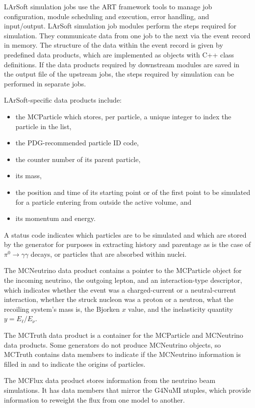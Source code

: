 \documentclass[12pt]{elsarticle}
\begin{document}
LArSoft simulation jobs use the ART framework tools to manage job configuration, module scheduling and execution, error handling, and input/output. LArSoft simulation job modules perform the steps required for simulation. They communicate data from one job to the next via the event record in memory. The structure of the data within the event record is given by predefined data products, which are implemented as objects with C++ class definitions. If the data products required by downstream modules are saved in the output file of the upstream jobs, the steps required by simulation can be performed in separate jobs.

LArSoft-specific data products include:
\begin{itemize}

\item{the MCParticle which stores, per particle, a unique integer to index the particle in the list,}
\item{the PDG-recommended particle ID code\cite{pdgcode}, }
\item{the counter number of its parent particle,}
\item{its mass,}
\item{the position and time of its starting point or of the first point to be simulated
for a particle entering from outside the active volume, and}
\item{its momentum and energy.}
\end{itemize}
A status code indicates which particles are to be simulated and which
are stored by the generator for purposes in extracting history and parentage as is the
case of $\pi^0\rightarrow\gamma\gamma$ decays, or particles that are absorbed within
nuclei.

The MCNeutrino data product contains a pointer to the MCParticle object for
the incoming neutrino, the outgoing lepton, and an interaction-type descriptor,
which indicates whether the event was a charged-current or a neutral-current interaction,
whether the struck nucleon was a proton or a neutron, what the recoiling system's mass is,
the Bjorken $x$ value, and the inelasticity quantity $y=E_\ell/E_\nu$.

The MCTruth data product is a container for the MCParticle and MCNeutrino
data products.  Some generators do not produce MCNeutrino objects, so MCTruth contains data members to indicate if the MCNeutrino information is filled in and to indicate the origins of particles.
 
The MCFlux data product stores information from the neutrino beam simulations. It has data members that mirror the G4NuMI ntuples, which provide information to reweight the flux from one model to another.
\end{document}
